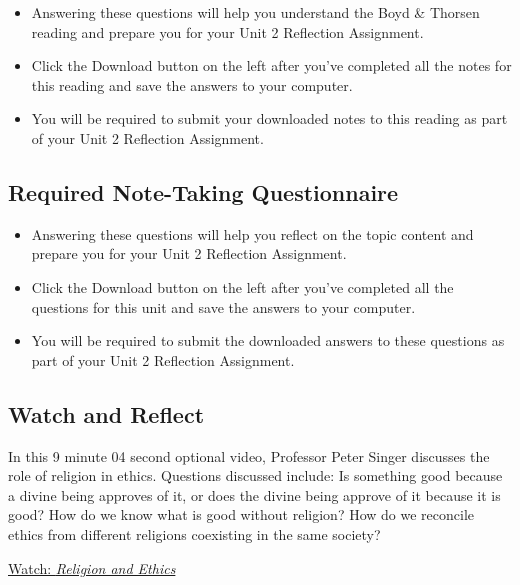 \documentclass[
]{book}
\providecommand{\tightlist}{%
  \setlength{\itemsep}{0pt}\setlength{\parskip}{0pt}}
\begin{document}
\begin{reflect}
\begin{itemize}
\tightlist
\item
  Answering these questions will help you understand the Boyd \& Thorsen reading and prepare you for your Unit 2 Reflection Assignment.\\
\item
  Click the Download button on the left after you've completed all the notes for this reading and save the answers to your computer.\\
\item
  You will be required to submit your downloaded notes to this reading as part of your Unit 2 Reflection Assignment.
\end{itemize}
\end{reflect}

\hypertarget{required-note-taking-questionnaire-5}{%
\subsection*{Required Note-Taking Questionnaire}\label{required-note-taking-questionnaire-5}}

\begin{reflect}
\begin{itemize}
\tightlist
\item
  Answering these questions will help you reflect on the topic content and prepare you for your Unit 2 Reflection Assignment.
\item
  Click the Download button on the left after you've completed all the questions for this unit and save the answers to your computer.
\item
  You will be required to submit the downloaded answers to these questions as part of your Unit 2 Reflection Assignment.
\end{itemize}
\end{reflect}

\hypertarget{watch-and-reflect-11}{%
\subsection*{Watch and Reflect}\label{watch-and-reflect-11}}

\begin{reflect}
In this 9 minute 04 second optional video, Professor Peter Singer discusses the role of religion in ethics. Questions discussed include: Is something good because a divine being approves of it, or does the divine being approve of it because it is good? How do we know what is good without religion? How do we reconcile ethics from different religions coexisting in the same society?

\href{https://www.youtube.com/watch?v=w9QtjQ5Ow7Y}{Watch: \emph{Religion and Ethics}}
\end{reflect}
\end{document}
